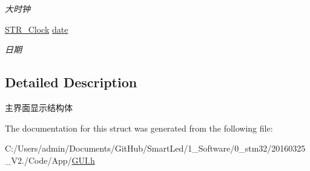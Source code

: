 \begin{DoxyCompactItemize}
\begin{DoxyCompactList}\small\item\em 大时钟 \end{DoxyCompactList}\item 
\hypertarget{struct_s_t_r___gui_main_a0a2f31fa95aa5adc890350ccd73157f3}{\hyperlink{struct_s_t_r___clock}{\-S\-T\-R\-\_\-\-Clock} \hyperlink{struct_s_t_r___gui_main_a0a2f31fa95aa5adc890350ccd73157f3}{date}}\label{struct_s_t_r___gui_main_a0a2f31fa95aa5adc890350ccd73157f3}

\begin{DoxyCompactList}\small\item\em 日期 \end{DoxyCompactList}\end{DoxyCompactItemize}


\subsection{\-Detailed \-Description}
主界面显示结构体 

\-The documentation for this struct was generated from the following file\-:\begin{DoxyCompactItemize}
\item 
\-C\-:/\-Users/admin/\-Documents/\-Git\-Hub/\-Smart\-Led/1\-\_\-\-Software/0\-\_\-stm32/20160325\-\_\-\-V2./\-Code/\-App/\hyperlink{_g_u_i_8h}{\-G\-U\-I.\-h}\end{DoxyCompactItemize}
